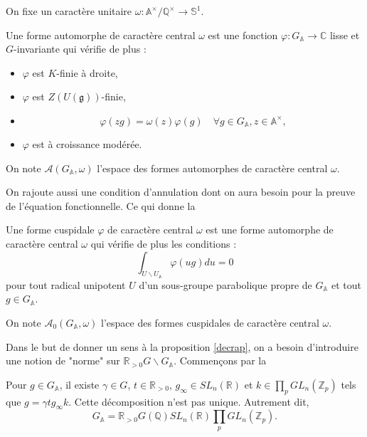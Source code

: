 On fixe un caractère unitaire $\omega : \mathbb{A}^\times/\mathbb{Q}^\times \rightarrow \mathbb{S}^1$.

\begin{definition}
Une forme automorphe de caractère central $\omega$ est une fonction $\varphi : G_\mathbb{A} \rightarrow \mathbb{C}$ lisse et $G$-invariante qui vérifie de plus :
\begin{itemize}
\item $\varphi$ est $K$-finie à droite,
\item $\varphi$ est $Z(U(\mathfrak{g}))$-finie,
\item \begin{equation}
\varphi(zg) = \omega(z)\varphi(g) \quad \forall g \in G_\mathbb{A}, z \in \mathbb{A}^\times,
\end{equation}
\item $\varphi$ est à croissance modérée.
\end{itemize}

On note $\mathcal{A}(G_\mathbb{A}, \omega)$ l'espace des formes automorphes de caractère central $\omega$.
\end{definition}

On rajoute aussi une condition d'annulation dont on aura besoin pour la preuve de l'équation fonctionnelle. Ce qui donne la
\begin{definition}
Une forme cuspidale $\varphi$ de caractère central $\omega$ est une forme automorphe de caractère central $\omega$ qui vérifie de plus les conditions :
\begin{equation}
\int_{U \backslash U_\mathbb{A}} \varphi(ug) du = 0
\end{equation}
pour tout radical unipotent $U$ d'un sous-groupe parabolique propre de $G_\mathbb{A}$ et tout $g \in G_\mathbb{A}$.

On note $\mathcal{A}_0(G_\mathbb{A}, \omega)$ l'espace des formes cuspidales de caractère central $\omega$.
\end{definition}

Dans le but de donner un sens à la proposition \ref{decrap}, on a besoin d'introduire une notion de "norme" sur $\mathbb{R}_{> 0}G\backslash G_\mathbb{A}$. Commençons par la
\begin{proposition}
\label{approx}
Pour $g \in G_\mathbb{A}$, il existe $\gamma \in G$, $t \in \mathbb{R}_{>0}$, $g_\infty \in SL_n(\mathbb{R})$ et $k \in \prod_p GL_n(\mathbb{Z}_p)$ tels que $g = \gamma t g_\infty k$. Cette décomposition n'est pas unique. Autrement dit,
\begin{equation}
G_\mathbb{A} = \mathbb{R}_{> 0}G(\mathbb{Q}) SL_n(\mathbb{R}) \prod_p GL_n(\mathbb{Z}_p).
\end{equation}
\end{proposition}

